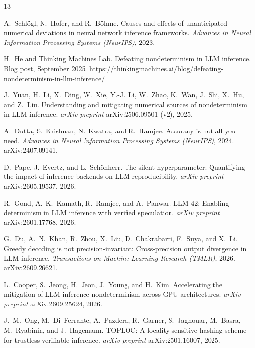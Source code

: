 \documentclass[11pt]{article}
\begin{document}
\begin{thebibliography}{13}
\small

A.~Schl\"ogl, N.~Hofer, and R.~B\"ohme.
\newblock Causes and effects of unanticipated numerical deviations in neural
network inference frameworks.
\newblock \emph{Advances in Neural Information Processing Systems (NeurIPS)},
2023.

H.~He and Thinking Machines Lab.
\newblock Defeating nondeterminism in LLM inference.
\newblock Blog post, September 2025.
\newblock \url{https://thinkingmachines.ai/blog/defeating-nondeterminism-in-llm-inference/}

J.~Yuan, H.~Li, X.~Ding, W.~Xie, Y.-J.~Li, W.~Zhao, K.~Wan, J.~Shi, X.~Hu,
and Z.~Liu.
\newblock Understanding and mitigating numerical sources of nondeterminism in
LLM inference.
\newblock \emph{arXiv preprint} arXiv:2506.09501 (v2), 2025.

A.~Dutta, S.~Krishnan, N.~Kwatra, and R.~Ramjee.
\newblock Accuracy is not all you need.
\newblock \emph{Advances in Neural Information Processing Systems (NeurIPS)},
2024.
\newblock arXiv:2407.09141.

D.~Pape, J.~Evertz, and L.~Sch\"onherr.
\newblock The silent hyperparameter: Quantifying the impact of inference
backends on LLM reproducibility.
\newblock \emph{arXiv preprint} arXiv:2605.19537, 2026.

R.~Gond, A.~K.~Kamath, R.~Ramjee, and A.~Panwar.
\newblock LLM-42: Enabling determinism in LLM inference with verified
speculation.
\newblock \emph{arXiv preprint} arXiv:2601.17768, 2026.

G.~Du, A.~N.~Khan, R.~Zhou, X.~Liu, D.~Chakrabarti, F.~Suya, and X.~Li.
\newblock Greedy decoding is not precision-invariant: Cross-precision output
divergence in LLM inference.
\newblock \emph{Transactions on Machine Learning Research (TMLR)}, 2026.
\newblock arXiv:2609.26621.

L.~Cooper, S.~Jeong, H.~Jeon, J.~Young, and H.~Kim.
\newblock Accelerating the mitigation of LLM inference nondeterminism across
GPU architectures.
\newblock \emph{arXiv preprint} arXiv:2609.25624, 2026.

J.~M.~Ong, M.~Di~Ferrante, A.~Pazdera, R.~Garner, S.~Jaghouar, M.~Basra,
M.~Ryabinin, and J.~Hagemann.
\newblock TOPLOC: A locality sensitive hashing scheme for trustless
verifiable inference.
\newblock \emph{arXiv preprint} arXiv:2501.16007, 2025.


\end{thebibliography}
\end{document}
